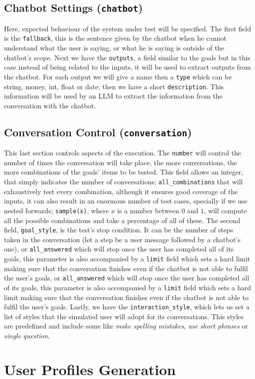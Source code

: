 \subsection{Chatbot Settings (\texttt{chatbot})}

Here, expected behaviour of the system under test will be specified.
The first field is the \texttt{fallback},
this is the sentence given by the chatbot when he cannot understand what the user is saying,
or what he is saying is outside of the chatbot's scope.
Next we have the \texttt{outputs}, a field similar to the goals
but in this case instead of being related to the inputs,
it will be used to extract outputs from the chatbot.
For each output we will give a name
then a \texttt{type} which can be string, money, int, float or date;
then we have a short \texttt{description}.
This information will be used by an \ac{LLM}
to extract the information from the conversation with the chatbot.


\subsection{Conversation Control (\texttt{conversation})}

This last section controls aspects of the execution.
The \texttt{number} will control the number of times the conversation will take place,
the more conversations, the more combinations of the goals' items to be tested.
This field allows an integer, that simply indicates the number of conversations;
\texttt{all\_combinations} that will exhaustively test every combination,
although it ensures good coverage of the inputs,
it can also result in an enormous number of test cases, specially if we use nested forwards;
\texttt{sample(x)}, where $x$ is a number between $0$ and $1$,
will compute all the possible combinations
and take a percentage of all of these.
The second field, \texttt{goal\_style}, is the test's stop condition.
It can be the number of steps taken in the conversation
(let a step be a user message followed by a chatbot's one),
or \texttt{all\_answered} which will stop once the user has completed all of its goals,
this parameter is also accompanied by a \texttt{limit} field which sets a hard limit
making sure that the conversation finishes even if the chatbot is not able to fulfil the user's goals,
or \texttt{all\_answered} which will stop once the user has completed all of its goals,
this parameter is also accompanied by a \texttt{limit} field which sets a hard limit
making sure that the conversation finishes even if the chatbot is not able to fulfil the user's goals.
Lastly, we have the \texttt{interaction\_style},
which lets us set a list of styles that the simulated user will adopt for its conversations.
This styles are predefined and include some like \textit{make spelling mistakes}, \textit{use short phrases}
or \textit{single question}.

\section{User Profiles Generation}\label{sec:profile-generation}
